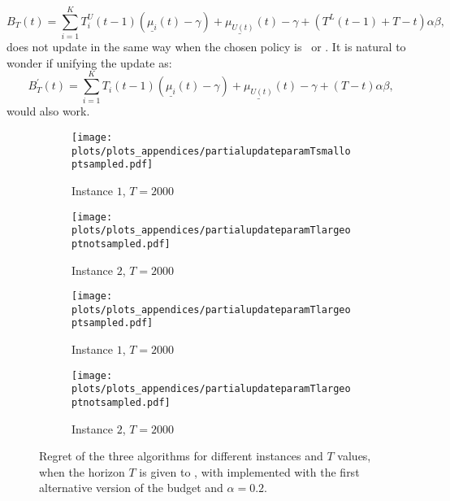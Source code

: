 \begin{APPENDICES}
    \[
B_{T}(t)=\sum_{i=1}^{K}T_i^U(t-1)(\underline{\mu_i}(t)-\gamma)+\underline{\mu_{U(t)}}(t)-\gamma+(T^L(t-1)+T-t)\alpha \beta,
\]
does not update in the same way when the chosen policy is \algucb\ or \alglcb. It is natural to wonder if unifying the update as:
        \[
B^{'}_{T}(t)=\sum_{i=1}^{K}T_i(t-1)(\underline{\mu_i}(t)-\gamma)+\underline{\mu_{U(t)}}(t)-\gamma+(T-t)\alpha \beta,
\]
would also work.
\begin{figure}[h!]
\begin{centering}
\begin{subfigure}{.48\textwidth}
  \centering
  \texttt{[image: plots/plots\_appendices/partialupdateparamTsmalloptsampled.pdf]}
  \caption{Instance $1$, $T=2000$}
\end{subfigure}%
\begin{subfigure}{.48\textwidth}
  \centering
  \texttt{[image: plots/plots\_appendices/partialupdateparamTlargeoptnotsampled.pdf]}
  \caption{Instance $2$, $T=2000$}
\end{subfigure}
\begin{subfigure}{.48\textwidth}
  \centering
  \texttt{[image: plots/plots\_appendices/partialupdateparamTlargeoptsampled.pdf]}
  \caption{Instance $1$, $T=2000$}
\end{subfigure}%
\begin{subfigure}{.48\textwidth}
  \centering
  \texttt{[image: plots/plots\_appendices/partialupdateparamTlargeoptnotsampled.pdf]}
  \caption{Instance $2$, $T=2000$}
\end{subfigure}
\caption{Regret of the three algorithms for different instances and $T$ values, when the horizon $T$ is given to \algoname, with \algoname implemented with the first alternative version of the budget and $\alpha=0.2$.}
\label{fig:badversion}
\end{centering}
\end{figure}


\end{APPENDICES}
